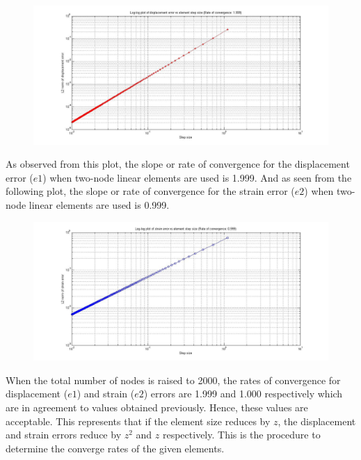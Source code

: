 \documentclass[12pt]{article}
\begin{document}
\begin{figure}[ht]
\begin{center}
\includegraphics[scale=0.4]{disp.jpg}
\end{center}
\end{figure}
As observed from this plot, the slope or rate of convergence for the displacement error ($e1$) when two-node linear elements are used is 1.999.
And as seen from the following plot, the slope or rate of convergence for the strain error ($e2$) when two-node linear elements are used is 0.999.\\
\begin{figure}[ht]
\begin{center}
\includegraphics[scale=0.35]{strain.jpg}
\end{center}
\end{figure} 
 
When the total number of nodes is raised to 2000, the rates of convergence for displacement ($e1$) and strain ($e2$) errors are 1.999 and 1.000 respectively which are in agreement to values obtained previously. Hence, these values are acceptable. This represents that if the element size reduces by $z$, the displacement and strain errors reduce by $z^{2}$ and $z$ respectively. This is the procedure to determine the converge rates of the given elements.
\end{document}
